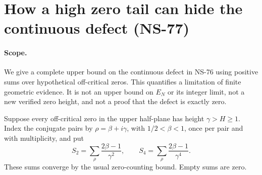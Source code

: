 \section{How a high zero tail can hide the continuous defect (NS-77)}
\label{sec:ns77-continuous-tail}

\paragraph{Scope.}
We give a complete upper bound on the continuous defect in NS-76 using
positive sums over hypothetical off-critical zeros. This quantifies a
limitation of finite geometric evidence. It is not an upper bound on
$E_N$ or its integer limit, not a new verified zero height, and not a
proof that the defect is exactly zero.

Suppose every off-critical zero in the upper half-plane has height
$\gamma>H\geq1$. Index the conjugate pairs by $\rho=\beta+i\gamma$,
with $1/2<\beta<1$, once per pair and with multiplicity, and put
\[
 S_2=\sum_\rho\frac{2\beta-1}{\gamma^2},\qquad
 S_4=\sum_\rho\frac{2\beta-1}{\gamma^4}.
\]
These sums converge by the usual zero-counting bound. Empty sums are zero.

